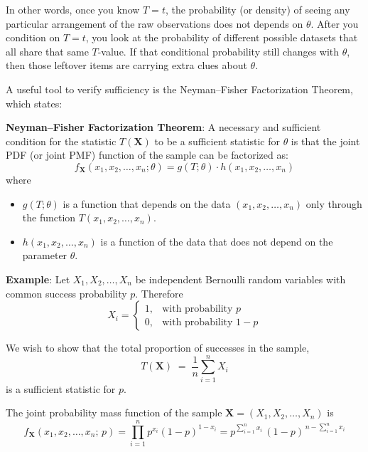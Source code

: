 \documentclass[twoside]{book}
\begin{document}
\begin{enumerate}
   In other words, once you know \(T = t\), the probability (or density) of seeing any particular arrangement of the raw observations does not depends on \(\theta\). After you condition on \(T = t\), you look at the probability of different possible datasets that all share that same \(T\)-value. If that conditional probability still changes with \(\theta\), then those leftover items are carrying extra clues about \(\theta\).


   A useful tool to verify sufficiency is the {Neyman–Fisher Factorization Theorem}, which states:

    \begin{textbox}
    \textbf{Neyman–Fisher Factorization Theorem}: A necessary and sufficient condition for the statistic $T(\textbf{X})$ to be a sufficient statistic for $\theta$ is that the joint PDF (or joint PMF) function of the sample can be factorized as:
        \[
         f_{\mathbf{X}}(x_1, x_2, \ldots, x_n; \theta) = g(T;\theta) \cdot h(x_1, x_2, \ldots, x_n)
        \]
        where
        \begin{itemize}
            \item $g(T;\theta)$ is a function that depends on the data
             $ (x_1, x_2, \ldots, x_n) $ only through the function $T(x_1, x_2, \ldots, x_n)$.
            \item $h(x_1, x_2, \ldots ,x_n)$ is a function of the data that does not depend on the parameter $\theta$.
        \end{itemize}
    \end{textbox}

    \bigskip

    \textbf{Example}: Let \(X_1, X_2, \dots, X_n\) be independent Bernoulli random variables with common success probability \(p\). Therefore
    \[
    X_i =
    \begin{cases}
    1, & \text{with probability } p\\
    0, & \text{with probability } 1 - p
    \end{cases}
    \]

    We wish to show that the total proportion of successes in the sample,
    \[
    T(\mathbf{X}) \;=\; \frac{1}{n}\sum_{i=1}^n X_i
    \]
    is a sufficient statistic for \(p\).


    The joint probability mass function of the sample \(\textbf{X} = (X_1,X_2,\dots,X_n)\) is
    \[
    f_{\textbf{X}}(x_1,x_2,\dots,x_n;\,p) = \prod_{i=1}^{n} p^{x_i}(1-p)^{1-x_i}
    =
    p^{\sum_{i=1}^n x_i}
    \,(1 - p)^{\,n - \sum_{i=1}^n x_i}
    \]


\end{enumerate}
\end{document}
